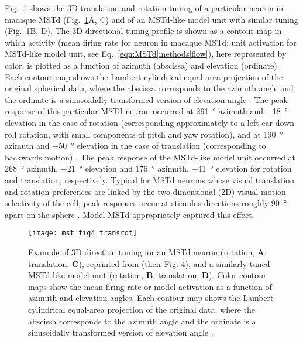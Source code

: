 Fig.~\ref{fig:MSTd|transrot} shows the 3D translation and rotation tuning 
of a particular neuron in macaque \ac{MSTd} (Fig.~\ref{fig:MSTd|transrot}A, C)
\citep{Takahashi2007} and of an \ac{MSTd}-like model unit with similar tuning
(Fig.~\ref{fig:MSTd|transrot}B, D). The 3D directional tuning profile is 
shown as a contour map in which activity (mean firing rate for neuron in 
macaque \ac{MSTd}; unit activation for \ac{MSTd}-like model unit, see 
Eq.~\ref{eqn:MSTd|methods|flow}), here represented by color, is plotted as a
function of azimuth (abscissa) and elevation (ordinate). Each contour map 
shows the Lambert cylindrical equal-area projection of the original spherical 
data, where the abscissa corresponds to the azimuth angle and the ordinate is
a sinusoidally transformed version of elevation angle \citep{Snyder1987}.
The peak response of this particular \ac{MSTd} neuron occurred at 
\SI{291}{\degree} azimuth and \SI{-18}{\degree} elevation in the case of 
rotation (corresponding approximately to a left ear-down roll rotation, 
with small components of pitch and yaw rotation), and at \SI{190}{\degree}
azimuth and \SI{-50}{\degree} elevation in the case of translation 
(corresponding to backwards motion) \citep{Takahashi2007}. 
The peak response of the \ac{MSTd}-like model unit occurred at \SI{268}{\degree}
azimuth, \SI{-21}{\degree} elevation and \SI{176}{\degree} azimuth, 
\SI{-41}{\degree} elevation for rotation and translation, respectively. 
Typical for \ac{MSTd} neurons whose visual translation and rotation preferences
are linked by the two-dimensional (2D) visual motion selectivity of the cell, 
peak responses occur at stimulus directions roughly \SI{90}{\degree} apart 
on the sphere \citep{Takahashi2007}.
Model \ac{MSTd} appropriately captured this effect.

\begin{figure}[t]
  \centering
  \texttt{[image: mst\_fig4\_transrot]}
  \caption{
  Example of 3D direction tuning for an \ac{MSTd} neuron (rotation, \textbf{A};
  translation, \textbf{C}), reprinted from \cite{Takahashi2007} (their Fig. $4$),
  and a similarly tuned \ac{MSTd}-like model unit (rotation, \textbf{B};
  translation, \textbf{D}). Color contour maps show the mean firing rate or 
  model activation as a function of azimuth and elevation angles. Each contour 
  map shows the Lambert cylindrical equal-area projection of the original 
  data, where the abscissa corresponds to the azimuth angle and the ordinate 
  is a sinusoidally transformed version of elevation angle \citep{Snyder1987}.}
  \label{fig:MSTd|transrot}
\end{figure}

